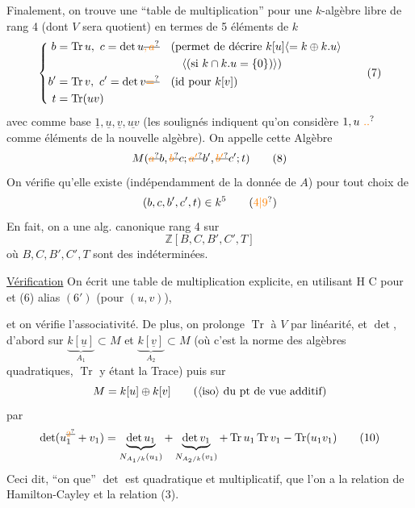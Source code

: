 Finalement, on trouve une ``table de multiplication'' pour une $k$-algèbre libre de rang 4 (dont $V$ sera quotient)  en termes de 5 éléments de $k$
\[
\left\{\begin{aligned}
 b&=\operatorname{Tr}u,\ c=\det u\deleted{\unsure{,a}}&
 &\text{(permet de décrire } k[u]\inserted{=k\oplus k.u}\\
 &&&\quad \inserted{\text{(si }k\cap k.u=\{0\}\text{)}}\text{)}\\
 b'&=\operatorname{Tr}v,\ c'=\det v\deleted{\unsure{=}}&&\text{(id pour } k[v]\text{)}\\
 t&=\operatorname{Tr}(uv)
\end{aligned}\right. \tag*{(7)}
\]
avec comme base $\underline{1},\underline{u},\underline{v},\underline{uv}$ (les soulignés indiquent qu'on considère $1,u\ \unsure{..}$ comme éléments de la nouvelle algèbre). On appelle cette Algèbre
\[ M(\deleted{\unsure{a}}b,\deleted{\unsure{b}}c;\deleted{\unsure{a'}}b',\deleted{\unsure{b'}}c';t) \tag*{(8)} \]
On vérifie qu'elle existe (indépendamment de la donnée de $A$) pour tout choix de 
\[ (b,c,b',c',t)\in k^5 \tag*{(\unsure{4|9})} \]
En fait, on a une alg. canonique  rang 4 sur
\[ \mathbb Z[B,C,B',C',T] \]
où $B,C,B',C',T$ sont des indéterminées.

\uline{Vérification} On écrit une table de multiplication explicite, en utilisant H C pour  et (6) alias $(6')$ (pour $(u,v)$),

et on vérifie l'associativité. De plus, on prolonge $\operatorname{Tr}$ à $V$ par linéarité, et $\det$,  d'abord sur $\underbrace{k[\underline u]}_{A_1}\subset M$ et $\underbrace{k[\underline v]}_{A_2}\subset M$ (où c'est  la norme des algèbres quadratiques, $\operatorname{Tr}$ y étant la Trace) puis sur
\[ M=k[u]\oplus k[v]\qquad\text{(}\inserted{\text{iso}}\ \text{du }\text{pt de vue}\ \text{additif)} \]
par
\[ \det(u_1^{\deleted{\unsure{2}}}+v_1)=\underbrace{\det u_1}_{N_{A_1/k}(u_1)}+\underbrace{\det v_1}_{N_{A_2/k}(v_1)}+\operatorname{Tr}u_1\operatorname{Tr}v_1-\operatorname{Tr}(u_1v_1) \tag*{(10)} \]
Ceci dit, ``on  que'' $\det$ est quadratique et multiplicatif, que l'on a la relation de Hamilton-Cayley et la relation (3).

